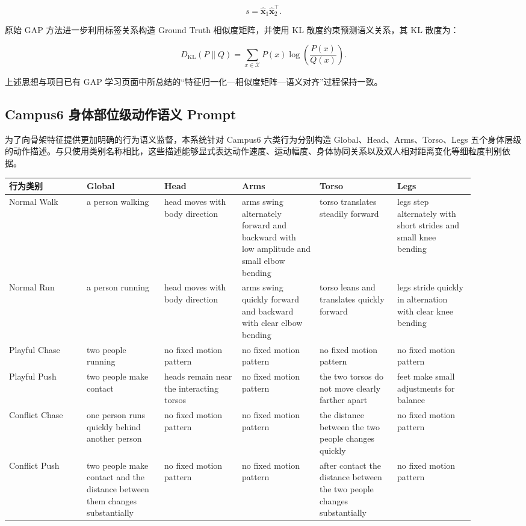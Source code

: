 \[
s
=
\hat{\mathbf x}_1
\hat{\mathbf x}_2^{\top}.
\]

原始 GAP 方法进一步利用标签关系构造 Ground Truth 相似度矩阵，并使用 KL 散度约束预测语义关系，其 KL 散度为：

\[
D_{\mathrm{KL}}(P\parallel Q)
=
\sum_{x\in\mathcal X}
P(x)
\log
\left(
\frac{P(x)}{Q(x)}
\right).
\]

上述思想与项目已有 GAP 学习页面中所总结的“特征归一化—相似度矩阵—语义对齐”过程保持一致。

\subsection{Campus6 身体部位级动作语义 Prompt}

为了向骨架特征提供更加明确的行为语义监督，本系统针对 Campus6 六类行为分别构造 Global、Head、Arms、Torso、Legs 五个身体层级的动作描述。与只使用类别名称相比，这些描述能够显式表达动作速度、运动幅度、身体协同关系以及双人相对距离变化等细粒度判别依据。

\begin{center}
\small
\begin{longtable}{|>{\raggedright\arraybackslash}p{0.15\linewidth}|>{\raggedright\arraybackslash}p{0.15\linewidth}|>{\raggedright\arraybackslash}p{0.15\linewidth}|>{\raggedright\arraybackslash}p{0.15\linewidth}|>{\raggedright\arraybackslash}p{0.15\linewidth}|>{\raggedright\arraybackslash}p{0.15\linewidth}|}
\hline
行为类别 & Global & Head & Arms & Torso & Legs \\
\hline
Normal Walk & a person walking & head moves with body direction & arms swing alternately forward and backward with low amplitude and small elbow bending & torso translates steadily forward & legs step alternately with short strides and small knee bending \\
\hline
Normal Run & a person running & head moves with body direction & arms swing quickly forward and backward with clear elbow bending & torso leans and translates quickly forward & legs stride quickly in alternation with clear knee bending \\
\hline
Playful Chase & two people running & no fixed motion pattern & no fixed motion pattern & no fixed motion pattern & no fixed motion pattern \\
\hline
Playful Push & two people make contact & heads remain near the interacting torsos & no fixed motion pattern & the two torsos do not move clearly farther apart & feet make small adjustments for balance \\
\hline
Conflict Chase & one person runs quickly behind another person & no fixed motion pattern & no fixed motion pattern & the distance between the two people changes quickly & no fixed motion pattern \\
\hline
Conflict Push & two people make contact and the distance between them changes substantially & no fixed motion pattern & no fixed motion pattern & after contact the distance between the two people changes substantially & no fixed motion pattern \\
\hline
\end{longtable}
\end{center}

